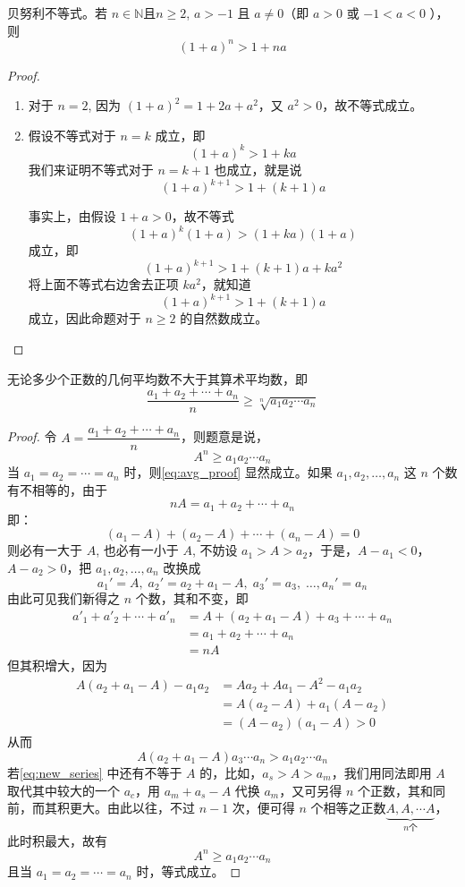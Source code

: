 \begin{example}\label{exp:bernoulli}
  贝努利不等式。若 $n\in\mathbb{N}$且$n\geqslant 2$, $a>-1$ 且 $a \neq 0$（即 $a>0$ 或 $-1<a<0$ ），则
\[(1+a)^n>1+na\]
\end{example}

\begin{proof}
\begin{enumerate}
  \item 对于 $n=2$, 因为 $(1+a)^2=1+2a+a^2$，又 $a^2>0$，故不等式成立。
  \item 假设不等式对于 $n=k$ 成立，即
  \[(1+a)^k>1+ka\]
  我们来证明不等式对于 $n=k+1$ 也成立，就是说
  \[(1+a)^{k+1}>1+(k+1)a\]

  事实上，由假设 $1+a>0$，故不等式
  \[(1+a)^k(1+a)>(1+ka)(1+a)\]
  成立，即
  \[(1+a)^{k+1}>1+(k+1)a+ka^2\]
  将上面不等式右边舍去正项 $ka^2$，就知道
  \[(1+a)^{k+1}>1+(k+1)a\]
  成立，因此命题对于 $n\geqslant 2$ 的自然数成立。
\end{enumerate}
\end{proof}

\begin{example}
  无论多少个正数的几何平均数不大于其算术平均数，即
\[\frac{a_1+a_2+\cdots+a_n}{n}\geqslant \sqrt[n]{a_1a_2\cdots a_n}\]
\end{example}

\begin{proof}
令 $A=\dfrac{a_1+a_2+\cdots+a_n}{n}$，则题意是说，
\begin{equation}
  \label{eq:avg_proof}
  A^n\geqslant a_1a_2\cdots a_n
\end{equation}
当 $a_1=a_2=\cdots= a_n$ 时，则\cref{eq:avg_proof} 显然成立。如果 $a_1,a_2,\ldots,a_n$ 这 $n$ 个数有不相等的，由于
    \[nA=a_1+a_2+\cdots+a_n\]
即：
\[(a_1-A)+(a_2-A)+\cdots+(a_n-A)=0\]
则必有一大于 $A$, 也必有一小于 $A$, 不妨设 $a_1>A>a_2$，于是，$A-a_1<0$，$A-a_2>0$，把 $a_1,a_2,\ldots,a_n$ 改换成
\begin{equation}
  \label{eq:new_series}
a_1'=A,\; a_2'=a_2+a_1-A,\; a_3'=a_3,\; \ldots, a_n'=a_n
\end{equation}
由此可见我们新得之 $n$ 个数，其和不变，即
\[\begin{split}
    a'_1+a'_2+\cdots +a'_n&=A+(a_2+a_1-A)+a_3+\cdots +a_n\\
&= a_1+a_2+\cdots +a_n\\
&=nA
\end{split}\]
但其积增大，因为
\[\begin{split}
    A(a_2+a_1-A)-a_1a_2&=Aa_2+Aa_1-A^2-a_1a_2\\
&=A(a_2-A)+a_1(A-a_2)\\
&=(A-a_2)(a_1-A)>0
\end{split}\]
从而
\[A(a_2+a_1-A)a_3\cdots a_n>a_1a_2\cdots a_n\]
若\cref{eq:new_series} 中还有不等于 $A$ 的，比如，$a_s>A>a_m$，我们用同法即用 $A$ 取代其中较大的一个 $a_c$，用 $a_m+a_s-A$ 代换 $a_m$，又可另得 $n$ 个正数，其和同前，而其积更大。由此以往，不过 $n-1$ 次，便可得 $n$ 个相等之正数$\underbrace{A,A,\cdots A}_{\text{$n$个}}$，此时积最大，故有
\[A^n\geqslant a_1a_2\cdots a_n\]
且当 $a_1=a_2=\cdots =a_n$ 时，等式成立。
\end{proof}

